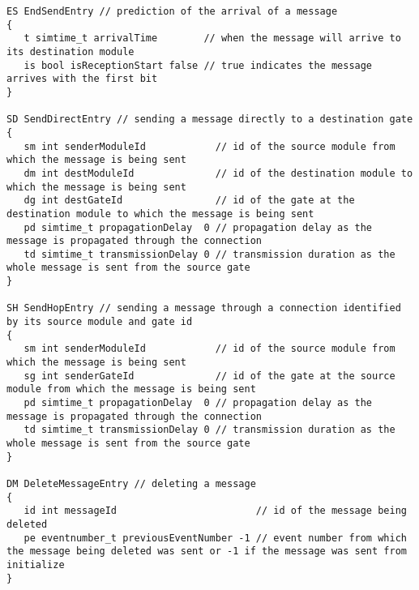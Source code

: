 \begin{verbatim}
ES EndSendEntry // prediction of the arrival of a message
{
   t simtime_t arrivalTime        // when the message will arrive to its destination module
   is bool isReceptionStart false // true indicates the message arrives with the first bit
}

SD SendDirectEntry // sending a message directly to a destination gate
{
   sm int senderModuleId            // id of the source module from which the message is being sent
   dm int destModuleId              // id of the destination module to which the message is being sent
   dg int destGateId                // id of the gate at the destination module to which the message is being sent
   pd simtime_t propagationDelay  0 // propagation delay as the message is propagated through the connection
   td simtime_t transmissionDelay 0 // transmission duration as the whole message is sent from the source gate
}

SH SendHopEntry // sending a message through a connection identified by its source module and gate id
{
   sm int senderModuleId            // id of the source module from which the message is being sent
   sg int senderGateId              // id of the gate at the source module from which the message is being sent
   pd simtime_t propagationDelay  0 // propagation delay as the message is propagated through the connection
   td simtime_t transmissionDelay 0 // transmission duration as the whole message is sent from the source gate
}

DM DeleteMessageEntry // deleting a message
{
   id int messageId                        // id of the message being deleted
   pe eventnumber_t previousEventNumber -1 // event number from which the message being deleted was sent or -1 if the message was sent from initialize
}
\end{verbatim}

